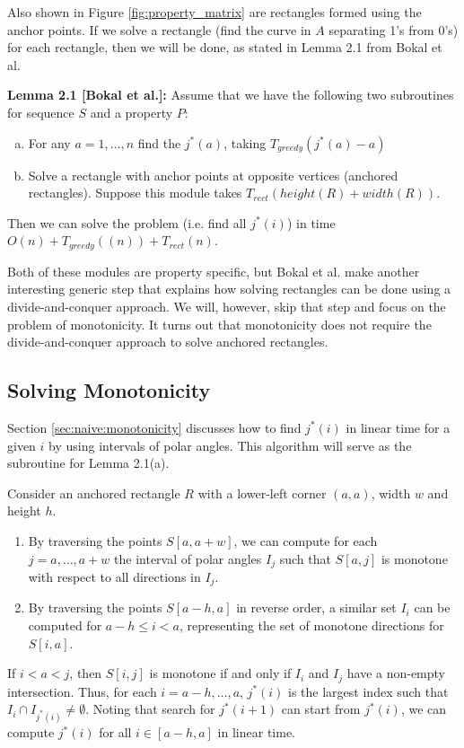 \documentclass{article}
\begin{document}
Also shown in Figure \ref{fig:property_matrix} are rectangles formed using the anchor points. If we solve a rectangle (find the curve in $A$ separating 1's from 0's) for each rectangle, then we will be done, as stated in Lemma 2.1 from Bokal et al.

\textbf{Lemma 2.1 [Bokal et al.]:} Assume that we have the following two subroutines for sequence $S$ and a property $P$:
\begin{enumerate}[(a)]
    \item For any $a = 1, \dots, n$ find the $j^*(a)$, taking $T_{greedy}(j^*(a) - a)$
    \item Solve a rectangle with anchor points at opposite vertices (anchored rectangles). Suppose this module takes $T_{rect}(height(R) + width(R))$.
\end{enumerate}
Then we can solve the problem (i.e. find all $j^*(i)$) in time $O(n) + T_{greedy}((n)) + T_{rect}(n)$.

Both of these modules are property specific, but Bokal et al. make another interesting generic step that explains how solving rectangles can be done using a divide-and-conquer approach. We will, however, skip that step and focus on the problem of monotonicity. It turns out that monotonicity does not require the divide-and-conquer approach to solve anchored rectangles.

\subsection{Solving Monotonicity}
Section \ref{sec:naive:monotonicity} discusses how to find $j^*(i)$ in linear time for a given $i$ by using intervals of polar angles. This algorithm will serve as the subroutine for Lemma 2.1(a).

Consider an anchored rectangle $R$ with a lower-left corner $(a, a)$, width $w$ and height $h$.
\begin{enumerate}[-]
\item By traversing the points $S[a, a + w]$, we can compute for each $j = a, \dots, a + w$ the interval of polar angles $I_j$ such that $S[a, j]$ is monotone with respect to all directions in $I_j$.
\item By traversing the points $S[a - h, a]$ in reverse order, a similar set $I_i$ can be computed for $a - h \leq i < a$, representing the set of monotone directions for $S[i, a]$.
\end{enumerate}

If $i < a < j$, then $S[i, j]$ is monotone if and only
if $I_i$ and $I_j$ have a non-empty intersection. Thus, for each
$i = a - h, \dots, a$, $j^*(i)$ is the largest index such that $I_i
\cap I_{j^*(i)} \neq \emptyset$.
Noting that search for $j^*(i+1)$
can start from $j^*(i)$, we can compute $j^*(i)$ for all $i \in [a
- h, a]$ in linear time.
\end{document}
